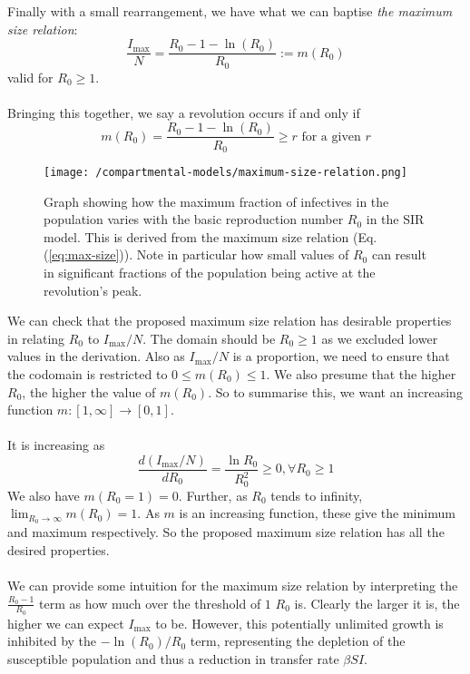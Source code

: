 Finally with a small rearrangement, we have what we can baptise \textit{the maximum size relation}:
\begin{equation}\label{eq:max-size}
	\frac{I_{\max}}{N}=\frac{R_0-1-\ln(R_0)}{R_0}:=m(R_0)
\end{equation}
valid for $R_0\geq1$.\\
\\
Bringing this together, we say a revolution occurs if and only if \[m(R_0)=\frac{R_0-1-\ln(R_0)}{R_0}\geq r \text{ for a given } r\]
\begin{figure}
	\centering
	\texttt{[image: /compartmental-models/maximum-size-relation.png]}
	\caption{Graph showing how the maximum fraction of infectives in the population varies with the basic reproduction number $R_0$ in the SIR model. This is derived from the maximum size relation (Eq. (\ref{eq:max-size})). Note in particular how small values of $R_0$ can result in significant fractions of the population being active at the revolution's peak.}
\end{figure}
We can check that the proposed maximum size relation has desirable properties in relating $R_0$ to $I_{\max}/N$. The domain should be $R_0\geq 1$ as we excluded lower values in the derivation. Also as $I_{\max}/N$ is a proportion, we need to ensure that the codomain is restricted to $0\leq m(R_0) \leq 1$. We also presume that the higher $R_0$, the higher the value of $m(R_0)$. So to summarise this, we want an increasing function $m:[1,\infty]\rightarrow[0,1]$.\\
\\
It is increasing as \[\frac{d(I_{\max}/N)}{dR_0}=\frac{\ln R_0}{R_0^2}\geq0, \forall R_0\geq1\]
We also have $m(R_0=1)=0$. Further, as $R_0$ tends to infinity, $\lim_{R_0\rightarrow\infty}m(R_0)=1$\label{mmd}. As $m$ is an increasing function, these give the minimum and maximum respectively. So the proposed maximum size relation has all the desired properties.\\
\\
We can provide some intuition for the maximum size relation by interpreting the $\frac{R_0-1}{R_0}$ term as how much over the threshold of $1$ $R_0$ is. Clearly the larger it is, the higher we can expect $I_{\max}$ to be. However, this potentially unlimited growth is inhibited by the ${-\ln(R_0)}/{R_0}$ term, representing the depletion of the susceptible population and thus a reduction in transfer rate $\beta S I$.\\
\\
